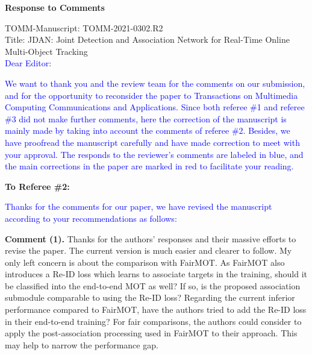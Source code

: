 \documentclass[12pt,journal,onecolumn]{IEEEtran}
\begin{document}
\begin{center}
	\textbf{\LARGE Response to Comments} 
\end{center}
\vspace{8pt} 

\noindent TOMM-Manuscript: TOMM-2021-0302.R2 \\

\noindent Title: JDAN: Joint Detection and Association Network for Real-Time Online Multi-Object Tracking \\

\noindent \textcolor{blue}{Dear Editor}:

\textcolor{blue}{
We want to thank you and the review team for the comments on our submission, and for the opportunity to reconsider the paper to Transactions on Multimedia Computing Communications and Applications.  
Since both referee \#1 and referee \#3 did not make further comments, here the correction of the manuscript is mainly made by taking into account the comments of referee \#2.
Besides, we have proofread the manuscript carefully and have made correction to meet with your approval. 
The responds to the reviewer's comments are labeled in blue, 
and the main corrections in the paper are marked in red to facilitate your reading. 
}

\vspace{8pt} 

\newpage





\textbf{To Referee \#2:}

\textcolor{blue}{Thanks for the comments for our paper, we have revised the manuscript according to your recommendations as follows:}

\textbf{Comment (1).} Thanks for the authors’ responses and their massive efforts to revise the paper. 
The current version is much easier and clearer to follow.
My only left concern is about the comparison with FairMOT. 
As FairMOT also introduces a Re-ID loss which learns to associate targets in the training, should it be classified into the end-to-end MOT as well? 
If so, is the proposed association submodule comparable to using the Re-ID loss?
%
Regarding the current inferior performance compared to FairMOT, have the authors tried to add the Re-ID loss in their end-to-end training? 
For fair comparisons, the authors could consider to apply the post-association processing used in FairMOT to their approach. 
This may help to narrow the performance gap.
\end{document}
